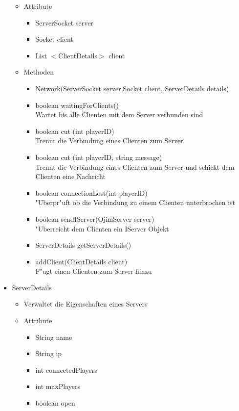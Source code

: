 \documentclass[a4paper,10pt]{article}
\begin{document}
\begin{itemize}
\begin {itemize}
\item Attribute
\begin{itemize}
\item ServerSocket server
\item Socket client
\item List $<$ClientDetails$>$ client
\end{itemize}
\item Methoden
\begin{itemize}
\item Network(ServerSocket server,Socket client, ServerDetails details) 
\item boolean waitingForClients()
\\Wartet bis alle Clienten mit dem Server verbunden sind
\item boolean cut (int playerID)
\\Trennt die Verbindung eines Clienten zum Server
\item boolean cut (int playerID, string message)
\\Trennt die Verbindung eines Clienten zum Server und schickt dem Clienten eine Nachricht
\item boolean connectionLost(int playerID)
\\"Uberpr"uft ob die Verbindung zu einem Clienten unterbrochen ist
\item boolean sendIServer(OjimServer server)
\\"Uberreicht dem Clienten ein IServer Objekt
\item ServerDetails getServerDetails()
\item addClient(ClientDetails client)
\\F"ugt einen Clienten zum Server hinzu
\end{itemize}
\end{itemize}
\item ServerDetails
\begin{itemize}
\item Verwaltet die Eigenschaften eines Servers
\end{itemize}
\begin {itemize}
\item Attribute
\begin{itemize}
\item String name
\item String ip
\item int connectedPlayers
\item int maxPlayers
\item boolean open

\end{itemize}
\end{itemize}
\end{itemize}
\end{document}

